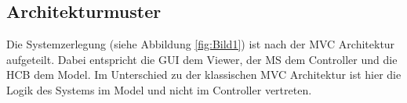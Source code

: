 \subsection{Architekturmuster}
Die Systemzerlegung (siehe Abbildung \ref{fig:Bild1}) ist nach der \ac{MVC} Architektur aufgeteilt. Dabei entspricht die \ac{GUI} dem Viewer, der \ac{MS} dem Controller und die \ac{HCB} dem Model. Im Unterschied zu der klassischen \ac{MVC} Architektur ist hier die Logik des Systems im Model und nicht im Controller vertreten. 